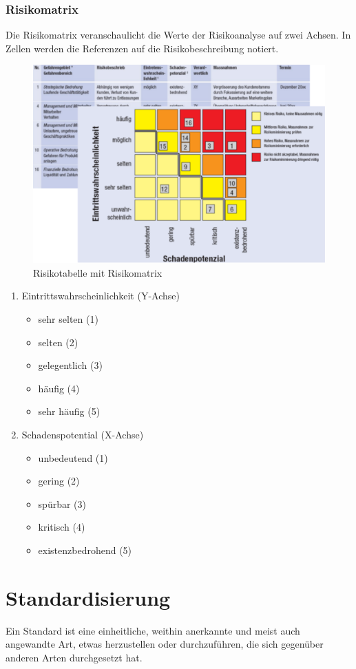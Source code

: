 \subsubsection{Risikomatrix}
Die Risikomatrix veranschaulicht die Werte der Risikoanalyse auf zwei Achsen. In Zellen werden die Referenzen auf die Risikobeschreibung notiert. 
\begin{figure}[h]
	\centering
	\includegraphics[width=0.8\linewidth]{images/risikomatrix}
	\caption{Risikotabelle mit Risikomatrix}
\end{figure}
\begin{enumerate}
	\item Eintrittswahrscheinlichkeit (Y-Achse)
	\begin{itemize}
		\item sehr selten (1)
		\item selten (2)
		\item gelegentlich (3)
		\item häufig (4)
		\item sehr häufig (5)
	\end{itemize}
	\item Schadenspotential (X-Achse)
	\begin{itemize}
		\item unbedeutend (1)
		\item gering (2)
		\item spürbar (3)
		\item kritisch (4)
		\item existenzbedrohend (5)
	\end{itemize}
\end{enumerate}

\section{Standardisierung}
Ein Standard ist eine einheitliche, weithin anerkannte und meist auch angewandte Art, etwas herzustellen oder durchzuführen, die sich gegenüber anderen Arten durchgesetzt hat.

